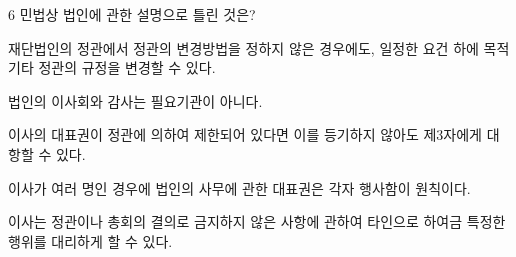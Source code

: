 \begin{question}{6}
민법상 법인에 관한 설명으로 틀린 것은?
\begin{choices}
  \item 재단법인의 정관에서 정관의 변경방법을 정하지 않은 경우에도, 일정한 요건 하에 목적 기타 정관의 규정을 변경할 수 있다.
  \item 법인의 이사회와 감사는 필요기관이 아니다.
  \item 이사의 대표권이 정관에 의하여 제한되어 있다면 이를 등기하지 않아도 제3자에게 대항할 수 있다.
  \item 이사가 여러 명인 경우에 법인의 사무에 관한 대표권은 각자 행사함이 원칙이다.
  \item 이사는 정관이나 총회의 결의로 금지하지 않은 사항에 관하여 타인으로 하여금 특정한 행위를 대리하게 할 수 있다.
\end{choices}
\end{question}
